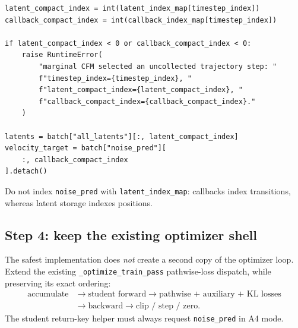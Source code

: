 \documentclass[11pt,a4paper]{article}
\theoremstyle{plain}
\theoremstyle{definition}
\begin{document}
\begin{lstlisting}[style=python,caption={Correct state/velocity alignment after map normalization.}]
latent_compact_index = int(latent_index_map[timestep_index])
callback_compact_index = int(callback_index_map[timestep_index])

if latent_compact_index < 0 or callback_compact_index < 0:
    raise RuntimeError(
        "marginal CFM selected an uncollected trajectory step: "
        f"timestep_index={timestep_index}, "
        f"latent_compact_index={latent_compact_index}, "
        f"callback_compact_index={callback_compact_index}."
    )

latents = batch["all_latents"][:, latent_compact_index]
velocity_target = batch["noise_pred"][
    :, callback_compact_index
].detach()
\end{lstlisting}

Do not index \texttt{noise\_pred} with \texttt{latent\_index\_map}: callbacks index transitions,
whereas latent storage indexes positions.

\subsection{Step 4: keep the existing optimizer shell}

The safest implementation does \emph{not} create a second copy of the optimizer loop.  Extend the
existing \texttt{\_optimize\_train\_pass} pathwise-loss dispatch, while preserving its exact
ordering:
\[
\begin{aligned}
\text{accumulate}
&\to
\text{student forward}
\to
\text{pathwise + auxiliary + KL losses}\\
&\to
\text{backward}
\to
\text{clip / step / zero}.
\end{aligned}
\]
The student return-key helper must always request \texttt{noise\_pred} in A4 mode.
\end{document}
